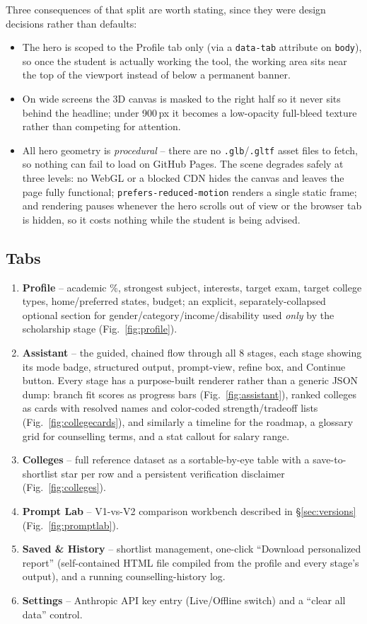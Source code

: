 \documentclass[11pt]{article}
\begin{document}
Three consequences of that split are worth stating, since they were design decisions rather than defaults:
\begin{itemize}
\item The hero is scoped to the Profile tab only (via a \texttt{data-tab} attribute on \texttt{body}), so once the student is actually working the tool, the working area sits near the top of the viewport instead of below a permanent banner.
\item On wide screens the 3D canvas is masked to the right half so it never sits behind the headline; under 900\,px it becomes a low-opacity full-bleed texture rather than competing for attention.
\item All hero geometry is \emph{procedural} -- there are no \texttt{.glb}/\texttt{.gltf} asset files to fetch, so nothing can fail to load on GitHub Pages. The scene degrades safely at three levels: no WebGL or a blocked CDN hides the canvas and leaves the page fully functional; \texttt{prefers-reduced-motion} renders a single static frame; and rendering pauses whenever the hero scrolls out of view or the browser tab is hidden, so it costs nothing while the student is being advised.
\end{itemize}

\subsection{Tabs}
\begin{enumerate}
\item \textbf{Profile} -- academic \%, strongest subject, interests, target exam, target college types, home/preferred states, budget; an explicit, separately-collapsed optional section for gender/category/income/disability used \emph{only} by the scholarship stage (Fig.~\ref{fig:profile}).
\item \textbf{Assistant} -- the guided, chained flow through all 8 stages, each stage showing its mode badge, structured output, prompt-view, refine box, and Continue button. Every stage has a purpose-built renderer rather than a generic JSON dump: branch fit scores as progress bars (Fig.~\ref{fig:assistant}), ranked colleges as cards with resolved names and color-coded strength/tradeoff lists (Fig.~\ref{fig:collegecards}), and similarly a timeline for the roadmap, a glossary grid for counselling terms, and a stat callout for salary range.
\item \textbf{Colleges} -- full reference dataset as a sortable-by-eye table with a save-to-shortlist star per row and a persistent verification disclaimer (Fig.~\ref{fig:colleges}).
\item \textbf{Prompt Lab} -- V1-vs-V2 comparison workbench described in \S\ref{sec:versions} (Fig.~\ref{fig:promptlab}).
\item \textbf{Saved \& History} -- shortlist management, one-click ``Download personalized report'' (self-contained HTML file compiled from the profile and every stage's output), and a running counselling-history log.
\item \textbf{Settings} -- Anthropic API key entry (Live/Offline switch) and a ``clear all data'' control.
\end{enumerate}
\end{document}
